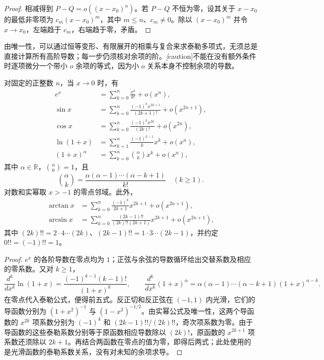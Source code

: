 \documentclass[UTF8,12pt,a4paper,fontset=fandol]{ctexbook}
\begin{document}
\begin{proof}
相减得到 $P-Q=o((x-x_0)^n)$。若 $P-Q$ 不恒为零，设其关于 $x-x_0$ 的最低非零项为 $c_m(x-x_0)^m$，其中 $m\leq n$、$c_m\neq0$。除以 $(x-x_0)^m$ 并令 $x\to x_0$，左端趋于 $c_m$，右端趋于零，矛盾。
\end{proof}

由唯一性，可以通过恒等变形、有限展开的相乘与复合来求泰勒多项式，无须总是直接计算所有高阶导数；每一步仍须核对余项的阶。\emph[caution]{不能在没有额外条件时逐项微分一个带小 $o$ 余项的等式，因为小 $o$ 关系本身不控制余项的导数。}

\begin{proposition}[常用麦克劳林公式]
\label{prop:standard-maclaurin-formulas}
对固定的正整数 $n$，当 $x\to0$ 时，有
\begin{align}
    e^x&=\sum_{k=0}^n\frac{x^k}{k!}+o(x^n),
        \label{eq:maclaurin-exponential}\\
    \sin x&=\sum_{k=0}^n\frac{(-1)^kx^{2k+1}}{(2k+1)!}
              +o(x^{2n+1}),
        \label{eq:maclaurin-sine}\\
    \cos x&=\sum_{k=0}^n\frac{(-1)^kx^{2k}}{(2k)!}
              +o(x^{2n}),
        \label{eq:maclaurin-cosine}\\
    \ln(1+x)&=\sum_{k=1}^n\frac{(-1)^{k-1}}k x^k+o(x^n),
        \label{eq:maclaurin-logarithm}\\
    (1+x)^\alpha&=\sum_{k=0}^n\binom\alpha k x^k+o(x^n),
        \label{eq:maclaurin-real-power}
\end{align}
其中 $\alpha\in\mathbb{R}$，$\binom\alpha0=1$，且
\[
    \binom\alpha k=\frac{\alpha(\alpha-1)\cdots(\alpha-k+1)}{k!}
    \quad(k\geq1).
\]
对数和实幂取 $x>-1$ 的零点邻域。此外，
\begin{align}
    \arctan x&=\sum_{k=0}^n\frac{(-1)^k}{2k+1}x^{2k+1}
                  +o(x^{2n+1}),
        \label{eq:maclaurin-arctangent}\\
    \arcsin x&=\sum_{k=0}^n
        \frac{(2k-1)!!}{(2k)!!(2k+1)}x^{2k+1}
                  +o(x^{2n+1}),
        \label{eq:maclaurin-arcsine}
\end{align}
其中 $(2k)!!=2\cdot4\cdots(2k)$、$(2k-1)!!=1\cdot3\cdots(2k-1)$，并约定 $0!!=(-1)!!=1$。
\end{proposition}

\begin{proof}
$e^x$ 的各阶导数在零点均为 $1$；正弦与余弦的导数循环给出交替系数及相应的零系数。又对 $k\geq1$，
\[
    \frac{d^k}{dx^k}\ln(1+x)
    =\frac{(-1)^{k-1}(k-1)!}{(1+x)^k},\qquad
    \frac{d^k}{dx^k}(1+x)^\alpha
    =\alpha(\alpha-1)\cdots(\alpha-k+1)(1+x)^{\alpha-k}.
\]
在零点代入泰勒公式，便得前五式。反正切和反正弦在 $(-1,1)$ 内光滑，它们的导函数分别为 $(1+x^2)^{-1}$ 与 $(1-x^2)^{-1/2}$。由实幂公式及唯一性，这两个导函数的 $x^{2k}$ 项系数分别为 $(-1)^k$ 和 $(2k-1)!!/(2k)!!$，奇次项系数为零。由于导函数的这些泰勒系数分别等于原函数相应导数除以 $(2k)!$，原函数的 $x^{2k+1}$ 项系数还须除以 $2k+1$。再结合两函数在零点的值为零，即得后两式；此处使用的是光滑函数的泰勒系数关系，没有对未知的余项求导。
\end{proof}
\end{document}
